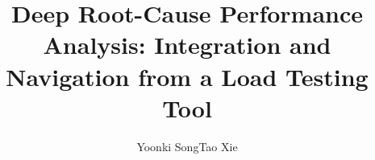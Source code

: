\documentclass{sig-alternate}
\begin{document}
\title{Deep Root-Cause Performance Analysis: Integration and Navigation from a Load Testing Tool}

\author{
Yoonki Song\hspace*{0.3in}Tao Xie\\
       \\
       \\
       \textit{}
}

\maketitle




\end{document}
